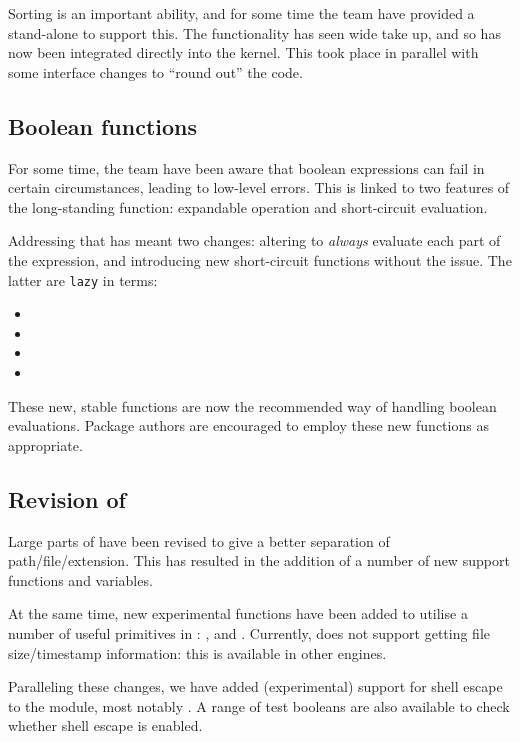 \documentclass{ltnews}
\begin{document}
Sorting is an important ability, and for some time the team have provided a
stand-alone  to support this. The functionality has seen wide take
up, and so has now been integrated directly into the kernel. This took place in
parallel with some interface changes to \enquote{round out} the code.

\subsection{Boolean functions}

For some time, the team have been aware that boolean expressions can fail in
certain circumstances, leading to low-level errors. This is linked to two
features of the long-standing  function: expandable operation
and short-circuit evaluation.

Addressing that has meant two changes: altering  to
\emph{always} evaluate each part of the expression, and introducing new
short-circuit functions without the issue. The latter are \verb|lazy| in 
terms:
\begin{itemize}
\item {}
\item {}
\item {}
\item {}
\end{itemize}
These new, stable functions are now the recommended way of handling boolean
evaluations. Package authors are encouraged to employ these new functions as
appropriate.

\subsection{Revision of }

Large parts of  have been revised to give a better separation of
path/file/extension. This has resulted in the addition of a number of new support
functions and variables.

At the same time, new experimental functions have been added to utilise a
number of useful primitives in : ,
 and . Currently, 
does not support getting file size/timestamp information: this is available in
other engines.

Paralleling these changes, we have added (experimental) support for shell
escape to the  module, most notably . A range of
test booleans are also available to check whether shell escape is enabled.
\end{document}
